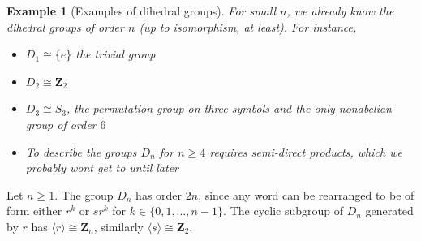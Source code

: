 \documentclass[12pt]{article}
\numberwithin{equation}{subsection}
\theoremstyle{note}
\newtheorem{example}[subsection]{Example}
\begin{document}
\begin{example}[Examples of dihedral groups] For small $n$, we already know the dihedral groups of order $n$ (up to isomorphism, at least). For instance,
\begin{itemize}
	\item $D_1\cong \{e\}$ the trivial group
	\item $D_2\cong \mathbf{Z}_2$
	\item $D_3\cong S_3$, the permutation group on three symbols and the only nonabelian group of order $6$
	\item To describe the groups $D_n$ for $n\geq 4$ requires semi-direct products, which we probably wont get to until later
\end{itemize}
\end{example}

Let $n\geq 1$. The group $D_n$ has order $2n$, since any word can be rearranged to be of form either $r^k$ or $sr^k$ for $k\in\{0,1,\dots,n-1\}$. The cyclic subgroup of $D_n$ generated by $r$ has $\langle r\rangle \cong \mathbf{Z}_n$, similarly $\langle s\rangle \cong \mathbf{Z}_2$. 
\end{document}
